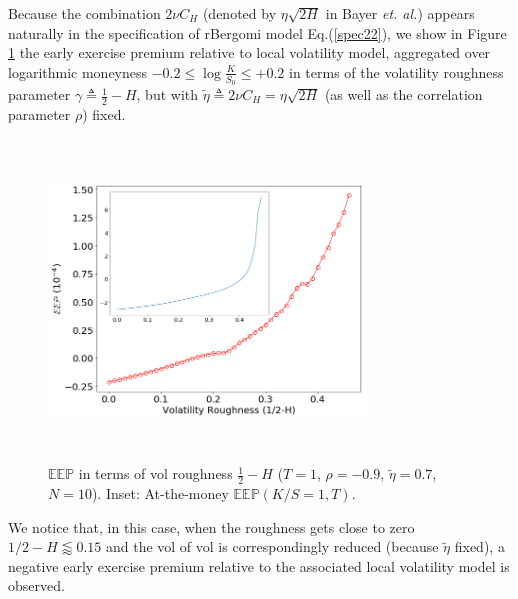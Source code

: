 \documentclass[12pt]{article}
\numberwithin{equation}{section}
\begin{document}
Because the combination $2\nu C_H$ (denoted by $\eta\sqrt{2H}$ in Bayer \textit{et. al.}\cite{bayer}) appears naturally in the specification of rBergomi model Eq.(\ref{spec22}), we show in Figure \ref{fig:eep_H_fixed_eta} the early exercise premium relative to local volatility model, aggregated over logarithmic moneyness $-0.2\le\log \frac{K}{S_0}\le +0.2$ in terms of the volatility roughness parameter $\gamma\triangleq \frac{1}{2}-H$, but with $\tilde{\eta} \triangleq 2\nu C_H = \eta\sqrt{2H}$ (as well as the correlation parameter $\rho$) fixed.

\begin{figure}[!htb]
\begin{center}
  \includegraphics[width=0.75\textwidth, height=8.5cm]{eep_H_fixed_eta}
\caption{$\mathbb{EEP}$ in terms of vol roughness $\frac{1}{2}-H$ ($T=1$, $\rho=-0.9$, $\tilde{\eta} = 0.7$, $N=10$). Inset: At-the-money $\mathbb{EEP}(K/S=1,T)$.}
\label{fig:eep_H_fixed_eta}
\end{center}
\end{figure}

We notice that, in this case, when the roughness gets close to zero $1/2-H \lessapprox 0.15$ and the vol of vol is correspondingly reduced (because $\tilde{\eta}$ fixed), a negative early exercise premium relative to the associated local volatility model is observed.
\end{document}
